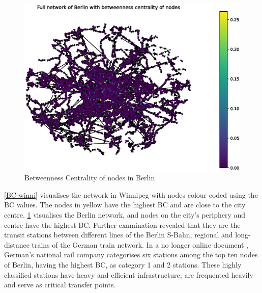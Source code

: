 \documentclass{article}
\theoremstyle{plain}
\theoremstyle{definition}
\theoremstyle{remark}
\begin{document}
\begin{figure}[ht]
\vskip -0.1in
\begin{center}
\centerline{\includegraphics[width=\columnwidth]{images/berlin_BC.eps}}
\caption{Betweenness Centrality of nodes in Berlin}
\label{BC-berlin}
\end{center}
\vskip -0.3in
\end{figure}

\cref{BC-winni} visualises the network in Winnipeg with nodes colour coded using the BC values. The nodes in yellow have the highest BC and are close to the city centre. \cref{BC-berlin} visualises the Berlin network, and nodes on the city's periphery and centre have the highest BC. Further examination revealed that they are the transit stations between different lines of the Berlin S-Bahn, regional and long-distance trains of the German train network. In a no longer online document \cite{DB_kategorien}, German's national rail company categorises six stations among the top ten nodes of Berlin, having the highest BC, as category 1 and 2 stations. These highly classified stations have heavy and efficient infrastructure, are frequented heavily and serve as critical transfer points.

\end{document}
